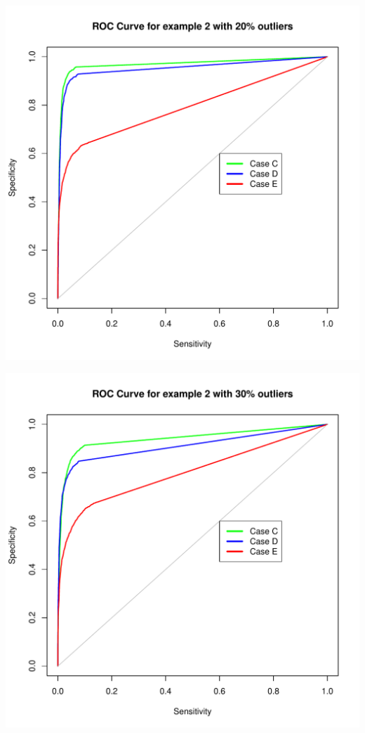 \documentclass{article}\usepackage[]{graphicx}\usepackage[]{color}
\makeatletter
\def\maxwidth{ %
  \ifdim\Gin@nat@width>\linewidth
    \linewidth
  \else
    \Gin@nat@width
  \fi
}
\newenvironment{knitrout}{}{} %
\makeatother
\begin{document}
\begin{knitrout}
\color{fgcolor}
\includegraphics[width=\maxwidth]{figure/unnamed-chunk-6-1} 

\end{knitrout}

\begin{knitrout}
\color{fgcolor}
\includegraphics[width=\maxwidth]{figure/unnamed-chunk-7-1} 

\end{knitrout}
\end{document}
